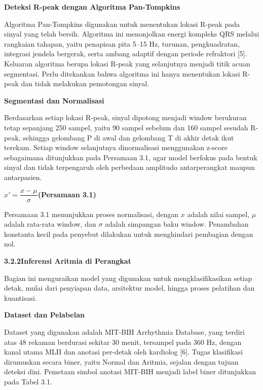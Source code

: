 \documentclass[11pt]{article}
\newcommand{\Subsec}[2]{\par\vspace{6pt}\noindent\textbf{#1\quad #2}\par\vspace{2pt}}
\newcommand{\Subsub}[1]{\par\vspace{5pt}\noindent\textbf{#1}\par\nopagebreak\vspace{1pt}}
\newcommand{\eqlabel}[1]{\hfill\textbf{(#1)}}
\begin{document}
\Subsub{Deteksi R-peak dengan Algoritma Pan-Tompkins}

Algoritma Pan-Tompkins digunakan untuk menentukan lokasi R-peak pada sinyal yang telah bersih. Algoritma ini menonjolkan energi kompleks QRS melalui rangkaian tahapan, yaitu penapisan pita 5--15 Hz, turunan, pengkuadratan, integrasi jendela bergerak, serta ambang adaptif dengan periode refraktori [5]. Keluaran algoritma berupa lokasi R-peak yang selanjutnya menjadi titik acuan segmentasi. Perlu ditekankan bahwa algoritma ini hanya menentukan lokasi R-peak dan tidak melakukan pemotongan sinyal.

\Subsub{Segmentasi dan Normalisasi}

Berdasarkan setiap lokasi R-peak, sinyal dipotong menjadi window berukuran tetap sepanjang 250 sampel, yaitu 90 sampel sebelum dan 160 sampel sesudah R-peak, sehingga gelombang P di awal dan gelombang T di akhir detak ikut terekam. Setiap window selanjutnya dinormalisasi menggunakan z-score sebagaimana ditunjukkan pada Persamaan 3.1, agar model berfokus pada bentuk sinyal dan tidak terpengaruh oleh perbedaan amplitudo antarperangkat maupun antarpasien.

\par\vspace{4pt}\noindent\hspace{10mm}$x' = \dfrac{x-\mu}{\sigma}$\eqlabel{Persamaan 3.1}\par\vspace{4pt}

Persamaan 3.1 menunjukkan proses normalisasi, dengan $x$ adalah nilai sampel, $\mu$ adalah rata-rata window, dan $\sigma$ adalah simpangan baku window. Penambahan konstanta kecil pada penyebut dilakukan untuk menghindari pembagian dengan nol.

\Subsec{3.2.2}{Inferensi Aritmia di Perangkat}

Bagian ini menguraikan model yang digunakan untuk mengklasifikasikan setiap detak, mulai dari penyiapan data, arsitektur model, hingga proses pelatihan dan kuantisasi.

\Subsub{Dataset dan Pelabelan}

Dataset yang digunakan adalah MIT-BIH Arrhythmia Database, yang terdiri atas 48 rekaman berdurasi sekitar 30 menit, tersampel pada 360 Hz, dengan kanal utama MLII dan anotasi per-detak oleh kardiolog [6]. Tugas klasifikasi dirumuskan secara biner, yaitu Normal dan Aritmia, sejalan dengan tujuan deteksi dini. Pemetaan simbol anotasi MIT-BIH menjadi label biner ditunjukkan pada Tabel 3.1.
\end{document}
